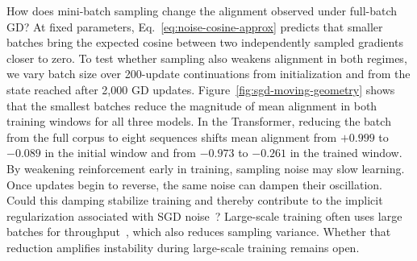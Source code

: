 How does mini-batch sampling change the alignment observed under full-batch GD? At fixed parameters, Eq.~\eqref{eq:noise-cosine-approx} predicts that smaller batches bring the expected cosine between two independently sampled gradients closer to zero. To test whether sampling also weakens alignment in both regimes, we vary batch size over 200-update continuations from initialization and from the state reached after 2,000 GD updates. Figure~\ref{fig:sgd-moving-geometry} shows that the smallest batches reduce the magnitude of mean alignment in both training windows for all three models. In the Transformer, reducing the batch from the full corpus to eight sequences shifts mean alignment from $+0.999$ to $-0.089$ in the initial window and from $-0.973$ to $-0.261$ in the trained window. By weakening reinforcement early in training, sampling noise may slow learning. Once updates begin to reverse, the same noise can dampen their oscillation. Could this damping stabilize training and thereby contribute to the implicit regularization associated with SGD noise~\cite{haochen2021shape,smith2021origin}? Large-scale training often uses large batches for throughput~\cite{mccandlish2018largebatch,chowdhery2022palm}, which also reduces sampling variance. Whether that reduction amplifies instability during large-scale training remains open.
